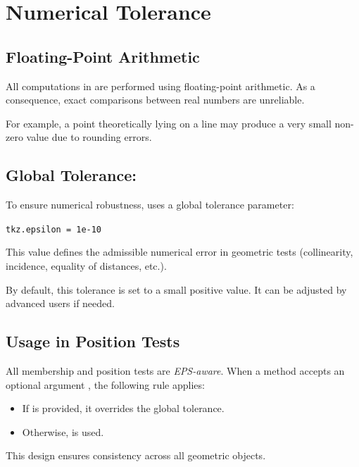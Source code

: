 \section{Numerical Tolerance}
\label{sec:numerical_tolerance}

\subsection{Floating-Point Arithmetic}

All computations in  are performed using
floating-point arithmetic.
As a consequence, exact comparisons between real numbers are unreliable.

For example, a point theoretically lying on a line may produce a
very small non-zero value due to rounding errors.

\subsection{Global Tolerance: }

To ensure numerical robustness, 
uses a global tolerance parameter:


\verb|tkz.epsilon = 1e-10|


This value defines the admissible numerical error in geometric tests
(collinearity, incidence, equality of distances, etc.).

\medskip
By default, this tolerance is set to a small positive value.
It can be adjusted by advanced users if needed.

\subsection{Usage in Position Tests}

All membership and position tests are \emph{EPS-aware}.
When a method accepts an optional argument , the following rule applies:

\begin{itemize}
\item If  is provided, it overrides the global tolerance.
\item Otherwise,  is used.
\end{itemize}

This design ensures consistency across all geometric objects.